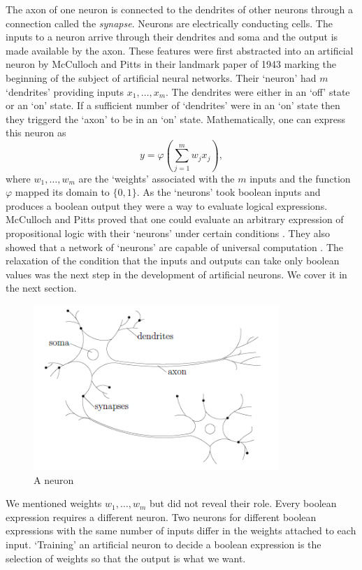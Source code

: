 \documentclass{article}
\numberwithin{equation}{section}
\begin{document}
The axon of one neuron is connected to the dendrites of other neurons through
a connection called the \emph{synapse}. Neurons are electrically conducting
cells. The inputs to a neuron arrive through their dendrites and soma and the 
output is made available by the axon. These features were first abstracted
into an artificial neuron by McCulloch and Pitts in their landmark paper 
\cite{mcculloch1943logical} of 1943 marking the beginning of the subject of
artificial neural networks. Their `neuron' had $m$ `dendrites' providing 
inputs $x_1, \ldots, x_m$. The dendrites were either in an `off' state or an
`on' state. If a sufficient number of `dendrites' were in an `on' state then 
they triggerd the `axon' to be in an `on' state. Mathematically, one can 
express this neuron as
\begin{equation}\label{s1e1}
y = \varphi\left(\sum_{j=1}^m w_j x_j\right),
\end{equation}
where $w_1, \ldots, w_m$ are the `weights' associated with the $m$ inputs and
the function $\varphi$ mapped its domain to $\{0, 1\}$. As the `neurons' took
boolean inputs and produces a boolean output they were a way to evaluate
logical expressions. McCulloch and Pitts proved that one could evaluate an
arbitrary expression of propositional logic with their `neurons' under certain
conditions \cite{mcculloch1943logical}. They also showed that a network of
`neurons' are capable of universal computation \cite{bishop1994neural}. The
relaxation of the condition that the inputs and outputs can take only boolean
values was the next step in the development of artificial neurons. We cover it
in the next section.
\begin{figure}[!ht]
\centering
\includegraphics[scale=0.5]{neuron}
\caption{A neuron}
\label{f1}
\end{figure}

We mentioned weights $w_1, \ldots, w_m$ but did not reveal their role. Every
boolean expression requires a different neuron. Two neurons for different
boolean expressions with the same number of inputs differ in the weights 
attached to each input. `Training' an artificial neuron to decide a boolean
expression is the selection of weights so that the output is what we want.
\end{document}

